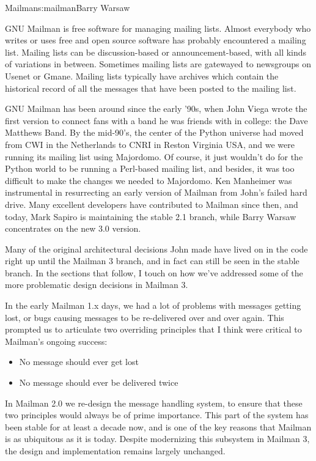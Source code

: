 \begin{aosachapter}{Mailman}{s:mailman}{Barry Warsaw}

GNU Mailman is free software for managing mailing lists.  Almost everybody who
writes or uses free and open source software has probably encountered a
mailing list.  Mailing lists can be discussion-based or announcement-based,
with all kinds of variations in between.  Sometimes mailing lists are
gatewayed to newsgroups on Usenet or Gmane.  Mailing lists typically have
archives which contain the historical record of all the messages that have
been posted to the mailing list.

GNU Mailman has been around since the early '90s, when John Viega wrote the
first version to connect fans with a band he was friends with in college: the
Dave Matthews Band.  By the mid-90's, the center of the Python universe had
moved from CWI in the Netherlands to CNRI in Reston Virginia USA, and we were
running its mailing list using Majordomo.  Of course, it just wouldn't do for
the Python world to be running a Perl-based mailing list, and besides, it was
too difficult to make the changes we needed to Majordomo.  Ken Manheimer was
instrumental in resurrecting an early version of Mailman from John's failed
hard drive.  Many excellent developers have contributed to Mailman since then,
and today, Mark Sapiro is maintaining the stable 2.1 branch, while Barry
Warsaw concentrates on the new 3.0 version.

Many of the original architectural decisions John made have lived on in the
code right up until the Mailman 3 branch, and in fact can still be seen in the
stable branch.  In the sections that follow, I touch on how we've addressed
some of the more problematic design decisions in Mailman 3.

In the early Mailman 1.x days, we had a lot of problems with messages getting
lost, or bugs causing messages to be re-delivered over and over again.  This
prompted us to articulate two overriding principles that I think were critical
to Mailman's ongoing success:

\begin{itemize}

\item No message should ever get lost

\item No message should ever be delivered twice

\end{itemize}

In Mailman 2.0 we re-design the message handling system, to ensure that these
two principles would always be of prime importance.  This part of the system
has been stable for at least a decade now, and is one of the key reasons that
Mailman is as ubiquitous as it is today.  Despite modernizing this subsystem
in Mailman 3, the design and implementation remains largely unchanged.


\end{aosachapter}

